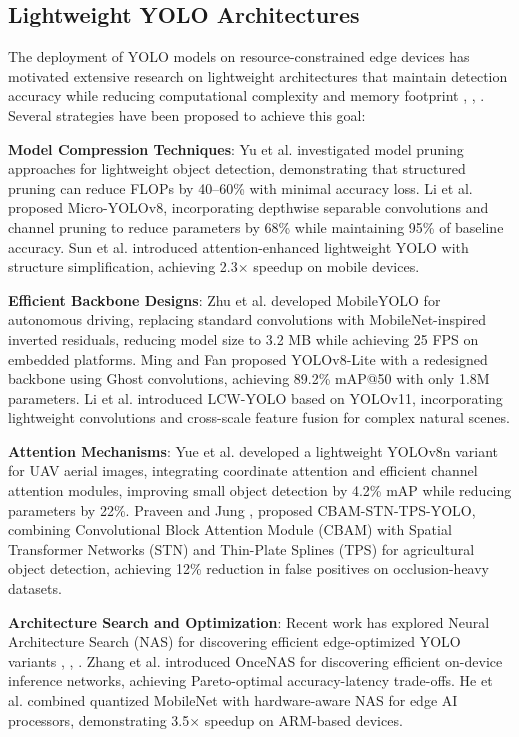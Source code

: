 \subsection{Lightweight YOLO Architectures}

The deployment of YOLO models on resource-constrained edge devices has motivated extensive research on lightweight architectures that maintain detection accuracy while reducing computational complexity and memory footprint \cite{2}, \cite{3}, \cite{7}. Several strategies have been proposed to achieve this goal:

\textbf{Model Compression Techniques}: Yu et al. \cite{2} investigated model pruning approaches for lightweight object detection, demonstrating that structured pruning can reduce FLOPs by 40--60\% with minimal accuracy loss. Li et al. \cite{10} proposed Micro-YOLOv8, incorporating depthwise separable convolutions and channel pruning to reduce parameters by 68\% while maintaining 95\% of baseline accuracy. Sun et al. \cite{11} introduced attention-enhanced lightweight YOLO with structure simplification, achieving 2.3$\times$ speedup on mobile devices.

\textbf{Efficient Backbone Designs}: Zhu et al. \cite{8} developed MobileYOLO for autonomous driving, replacing standard convolutions with MobileNet-inspired inverted residuals, reducing model size to 3.2 MB while achieving 25 FPS on embedded platforms. Ming and Fan \cite{12} proposed YOLOv8-Lite with a redesigned backbone using Ghost convolutions, achieving 89.2\% mAP@50 with only 1.8M parameters. Li et al. \cite{9} introduced LCW-YOLO based on YOLOv11, incorporating lightweight convolutions and cross-scale feature fusion for complex natural scenes.

\textbf{Attention Mechanisms}: Yue et al. \cite{16} developed a lightweight YOLOv8n variant for UAV aerial images, integrating coordinate attention and efficient channel attention modules, improving small object detection by 4.2\% mAP while reducing parameters by 22\%. Praveen and Jung \cite{15}, \cite{63} proposed CBAM-STN-TPS-YOLO, combining Convolutional Block Attention Module (CBAM) with Spatial Transformer Networks (STN) and Thin-Plate Splines (TPS) for agricultural object detection, achieving 12\% reduction in false positives on occlusion-heavy datasets.

\textbf{Architecture Search and Optimization}: Recent work has explored Neural Architecture Search (NAS) for discovering efficient edge-optimized YOLO variants \cite{36}, \cite{37}, \cite{38}. Zhang et al. \cite{36} introduced OnceNAS for discovering efficient on-device inference networks, achieving Pareto-optimal accuracy-latency trade-offs. He et al. \cite{39} combined quantized MobileNet with hardware-aware NAS for edge AI processors, demonstrating 3.5$\times$ speedup on ARM-based devices.

